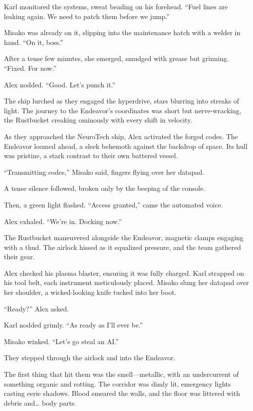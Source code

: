 \documentclass[12pt]{book}
\begin{document}
Karl monitored the systems, sweat beading on his forehead. \enquote{Fuel lines are leaking again. We need to patch them before we jump.}

Misako was already on it, slipping into the maintenance hatch with a welder in hand. \enquote{On it, boss.}

After a tense few minutes, she emerged, smudged with grease but grinning. \enquote{Fixed. For now.}

Alex nodded. \enquote{Good. Let’s punch it.}

The ship lurched as they engaged the hyperdrive, stars blurring into streaks of light. The journey to the Endeavor’s coordinates was short but nerve-wracking, the Rustbucket creaking ominously with every shift in velocity.

As they approached the NeuroTech ship, Alex activated the forged codes. The Endeavor loomed ahead, a sleek behemoth against the backdrop of space. Its hull was pristine, a stark contrast to their own battered vessel.

\enquote{Transmitting codes,} Misako said, fingers flying over her datapad.

A tense silence followed, broken only by the beeping of the console.

Then, a green light flashed. \enquote{Access granted,} came the automated voice.

Alex exhaled. \enquote{We’re in. Docking now.}

The Rustbucket maneuvered alongside the Endeavor, magnetic clamps engaging with a thud. The airlock hissed as it equalized pressure, and the team gathered their gear.

Alex checked his plasma blaster, ensuring it was fully charged. Karl strapped on his tool belt, each instrument meticulously placed. Misako slung her datapad over her shoulder, a wicked-looking knife tucked into her boot.

\enquote{Ready?} Alex asked.

Karl nodded grimly. \enquote{As ready as I’ll ever be.}

Misako winked. \enquote{Let’s go steal an AI.}

They stepped through the airlock and into the Endeavor.

The first thing that hit them was the smell---metallic, with an undercurrent of something organic and rotting. The corridor was dimly lit, emergency lights casting eerie shadows. Blood smeared the walls, and the floor was littered with debris and… body parts.
\end{document}
